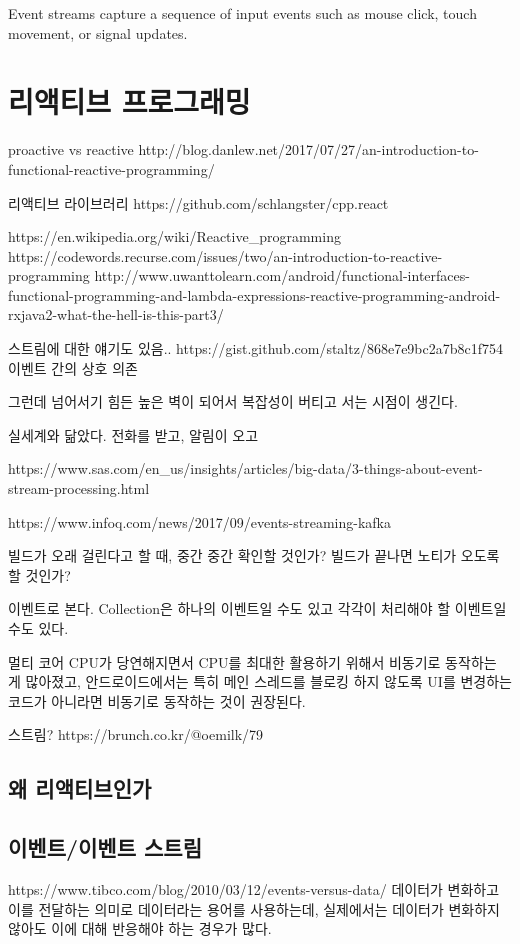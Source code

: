 \documentclass{book}
\begin{document}
Event streams capture a sequence of input events such as mouse click, touch movement, or signal updates.

\section{리액티브 프로그래밍}
proactive vs reactive
http://blog.danlew.net/2017/07/27/an-introduction-to-functional-reactive-programming/

리액티브 라이브러리
https://github.com/schlangster/cpp.react

https://en.wikipedia.org/wiki/Reactive_programming
https://codewords.recurse.com/issues/two/an-introduction-to-reactive-programming
http://www.uwanttolearn.com/android/functional-interfaces-functional-programming-and-lambda-expressions-reactive-programming-android-rxjava2-what-the-hell-is-this-part3/

스트림에 대한  얘기도 있음..
https://gist.github.com/staltz/868e7e9bc2a7b8c1f754
이벤트 간의 상호 의존

그런데 넘어서기 힘든 높은 벽이 되어서 복잡성이 버티고 서는 시점이 생긴다.

실세계와 닮았다.
전화를 받고, 알림이 오고

https://www.sas.com/en_us/insights/articles/big-data/3-things-about-event-stream-processing.html

https://www.infoq.com/news/2017/09/events-streaming-kafka

빌드가 오래 걸린다고 할 때, 중간 중간 확인할 것인가? 빌드가 끝나면 노티가 오도록 할 것인가?

이벤트로 본다. 
Collection은 하나의 이벤트일 수도 있고 각각이 처리해야 할 이벤트일 수도 있다.

멀티 코어 CPU가 당연해지면서 CPU를 최대한 활용하기 위해서 비동기로 동작하는 게  많아졌고, 안드로이드에서는 특히 메인 스레드를 블로킹 하지 않도록 UI를 변경하는 코드가 아니라면 비동기로 동작하는 것이 권장된다.

스트림?
https://brunch.co.kr/@oemilk/79

\subsection{왜 리액티브인가}

\subsection{이벤트/이벤트 스트림}
https://www.tibco.com/blog/2010/03/12/events-versus-data/
데이터가 변화하고 이를 전달하는 의미로 데이터라는 용어를 사용하는데, 실제에서는 데이터가 변화하지 않아도 이에 대해 반응해야 하는 경우가 많다. 
\end{document}
